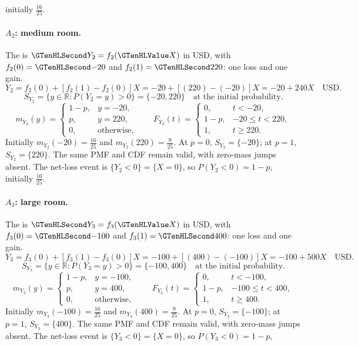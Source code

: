 initially $\frac{16}{25}$.
\paragraph{$A_2$: medium room.}
The  is $\Money{Y_2}=f_2(\Indicator{X})$ in USD,
with $f_2(0)=\Money{-20}$ and $f_2(1)=\Money{220}$: one loss and one gain.
\[
Y_2=f_2(0)+[f_2(1)-f_2(0)]X=-20+[(220)-(-20)]X=-20+240X\quad\text{USD}.
\]
\[S_{Y_2}=\{y\in\mathbb R:P(Y_2=y)>0\}=\{-20,220\}\quad\text{at the initial probability}.\]
\[
m_{Y_2}(y)=\begin{cases}1-p,&y=-20,\\p,&y=220,\\0,&\text{otherwise},\end{cases}
\qquad F_{Y_2}(t)=\begin{cases}0,&t<-20,\\1-p,&-20\leq t<220,\\1,&t\geq 220.\end{cases}
\]
Initially $m_{Y_2}(-20)=\frac{16}{25}$ and $m_{Y_2}(220)=\frac{9}{25}$.
At $p=0$, $S_{Y_2}=\{-20\}$; at $p=1$, $S_{Y_2}=\{220\}$.
The same PMF and CDF remain valid, with zero-mass jumps absent.
The net-loss event is $\{Y_2<0\}=\{X=0\}$, so $P(Y_2<0)=1-p$,
initially $\frac{16}{25}$.
\paragraph{$A_3$: large room.}
The  is $\Money{Y_3}=f_3(\Indicator{X})$ in USD,
with $f_3(0)=\Money{-100}$ and $f_3(1)=\Money{400}$: one loss and one gain.
\[
Y_3=f_3(0)+[f_3(1)-f_3(0)]X=-100+[(400)-(-100)]X=-100+500X\quad\text{USD}.
\]
\[S_{Y_3}=\{y\in\mathbb R:P(Y_3=y)>0\}=\{-100,400\}\quad\text{at the initial probability}.\]
\[
m_{Y_3}(y)=\begin{cases}1-p,&y=-100,\\p,&y=400,\\0,&\text{otherwise},\end{cases}
\qquad F_{Y_3}(t)=\begin{cases}0,&t<-100,\\1-p,&-100\leq t<400,\\1,&t\geq 400.\end{cases}
\]
Initially $m_{Y_3}(-100)=\frac{16}{25}$ and $m_{Y_3}(400)=\frac{9}{25}$.
At $p=0$, $S_{Y_3}=\{-100\}$; at $p=1$, $S_{Y_3}=\{400\}$.
The same PMF and CDF remain valid, with zero-mass jumps absent.
The net-loss event is $\{Y_3<0\}=\{X=0\}$, so $P(Y_3<0)=1-p$,
